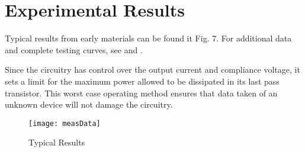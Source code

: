 \section{Experimental Results}
Typical results from early materials can be found it Fig. 7. For additional data and complete testing curves, see \cite{sThesis} and \cite{mThesis}.

Since the circuitry has control over the output current and compliance voltage, it sets a limit for the maximum power allowed to be dissipated in its last pass transistor. This worst case operating method ensures that data taken of an unknown device will not damage the circuitry.
\begin{figure}[here]
\centering
\texttt{[image: measData]}
\caption{Typical Results}
\label{fig:measData}
\end{figure}

